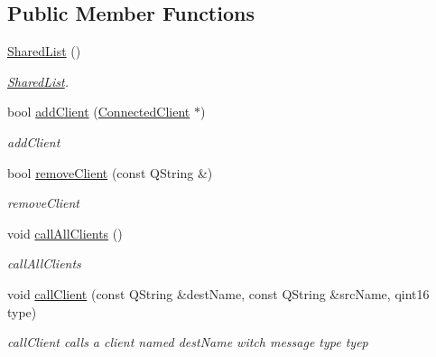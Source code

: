 \subsection*{Public Member Functions}
\begin{DoxyCompactItemize}
\item 
\hypertarget{classPenguinServer_1_1SharedList_a228585856adff620e9824e05136f1a65}{\hyperlink{classPenguinServer_1_1SharedList_a228585856adff620e9824e05136f1a65}{Shared\-List} ()}\label{classPenguinServer_1_1SharedList_a228585856adff620e9824e05136f1a65}

\begin{DoxyCompactList}\small\item\em \hyperlink{classPenguinServer_1_1SharedList}{Shared\-List}. \end{DoxyCompactList}\item 
bool \hyperlink{classPenguinServer_1_1SharedList_ab64f1d39eaaea4fcf299364a7e535270}{add\-Client} (\hyperlink{classPenguinServer_1_1ConnectedClient}{Connected\-Client} $\ast$)
\begin{DoxyCompactList}\small\item\em add\-Client \end{DoxyCompactList}\item 
bool \hyperlink{classPenguinServer_1_1SharedList_a5a6108894a1998d434ac9c9b4ec111b7}{remove\-Client} (const Q\-String \&)
\begin{DoxyCompactList}\small\item\em remove\-Client \end{DoxyCompactList}\item 
\hypertarget{classPenguinServer_1_1SharedList_a3f1af93454267de766e6d1495ca2d81e}{void \hyperlink{classPenguinServer_1_1SharedList_a3f1af93454267de766e6d1495ca2d81e}{call\-All\-Clients} ()}\label{classPenguinServer_1_1SharedList_a3f1af93454267de766e6d1495ca2d81e}

\begin{DoxyCompactList}\small\item\em call\-All\-Clients \end{DoxyCompactList}\item 
void \hyperlink{classPenguinServer_1_1SharedList_ab24885a029de18a5cd76507f4a7fb0f5}{call\-Client} (const Q\-String \&dest\-Name, const Q\-String \&src\-Name, qint16 type)
\begin{DoxyCompactList}\small\item\em call\-Client calls a client named dest\-Name witch message type tyep \end{DoxyCompactList}\end{DoxyCompactItemize}


